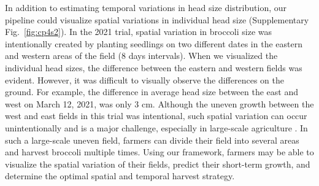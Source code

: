In addition to estimating temporal variations in head size distribution, our pipeline could visualize spatial variations in individual head size (Supplementary Fig.~\ref{fig:cp4s2}). In the 2021 trial, spatial variation in broccoli size was intentionally created by planting seedlings on two different dates in the eastern and western areas of the field (8 days intervals). When we visualized the individual head sizes, the difference between the eastern and western fields was evident. However, it was difficult to visually observe the differences on the ground. For example, the difference in average head size between the east and west on March 12, 2021, was only 3 cm. Although the uneven growth between the west and east fields in this trial was intentional, such spatial variation can occur unintentionally and is a major challenge, especially in large-scale agriculture \citep{quine_investigation_2002}. In such a large-scale uneven field, farmers can divide their field into several areas and harvest broccoli multiple times. Using our framework, farmers may be able to visualize the spatial variation of their fields, predict their short-term growth, and determine the optimal spatial and temporal harvest strategy.

